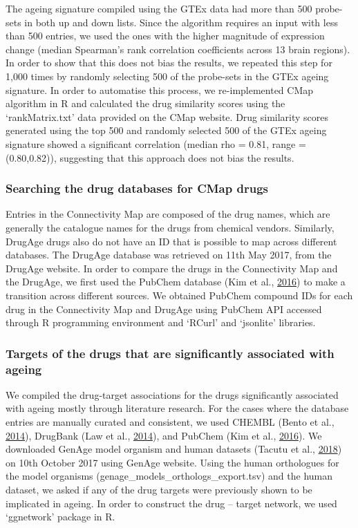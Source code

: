 \documentclass[12pt,twoside]{unicam}
\begin{document}
The ageing signature compiled using the GTEx data had more than 500 probe-sets in both up and down lists. Since the algorithm requires an input with less than 500 entries, we used the ones with the higher magnitude of expression change (median Spearman's rank correlation coefficients across 13 brain regions). In order to show that this does not bias the results, we repeated this step for 1,000 times by randomly selecting 500 of the probe-sets in the GTEx ageing signature. In order to automatise this process, we re-implemented CMap algorithm in R and calculated the drug similarity scores using the `rankMatrix.txt' data provided on the CMap website. Drug similarity scores generated using the top 500 and randomly selected 500 of the GTEx ageing signature showed a significant correlation (median rho = 0.81, range = (0.80,0.82)), suggesting that this approach does not bias the results.

\hypertarget{searching-the-drug-databases-for-cmap-drugs}{%
\subsubsection{Searching the drug databases for CMap drugs}\label{searching-the-drug-databases-for-cmap-drugs}}

Entries in the Connectivity Map are composed of the drug names, which are generally the catalogue names for the drugs from chemical vendors. Similarly, DrugAge drugs also do not have an ID that is possible to map across different databases. The DrugAge database was retrieved on 11th May 2017, from the DrugAge website. In order to compare the drugs in the Connectivity Map and the DrugAge, we first used the PubChem database (Kim et al., \protect\hyperlink{ref-Kim2016}{2016}) to make a transition across different sources. We obtained PubChem compound IDs for each drug in the Connectivity Map and DrugAge using PubChem API accessed through R programming environment and `RCurl' and `jsonlite' libraries.

\hypertarget{targets-of-the-drugs-that-are-significantly-associated-with-ageing}{%
\subsubsection{Targets of the drugs that are significantly associated with ageing}\label{targets-of-the-drugs-that-are-significantly-associated-with-ageing}}

We compiled the drug-target associations for the drugs significantly associated with ageing mostly through literature research. For the cases where the database entries are manually curated and consistent, we used CHEMBL (Bento et al., \protect\hyperlink{ref-Bento2014}{2014}), DrugBank (Law et al., \protect\hyperlink{ref-Law2014}{2014}), and PubChem (Kim et al., \protect\hyperlink{ref-Kim2016}{2016}). We downloaded GenAge model organism and human datasets (Tacutu et al., \protect\hyperlink{ref-Tacutu2018}{2018}) on 10th October 2017 using GenAge website. Using the human orthologues for the model organisms (genage\_models\_orthologs\_export.tsv) and the human dataset, we asked if any of the drug targets were previously shown to be implicated in ageing. In order to construct the drug -- target network, we used `ggnetwork' package in R.
\end{document}
